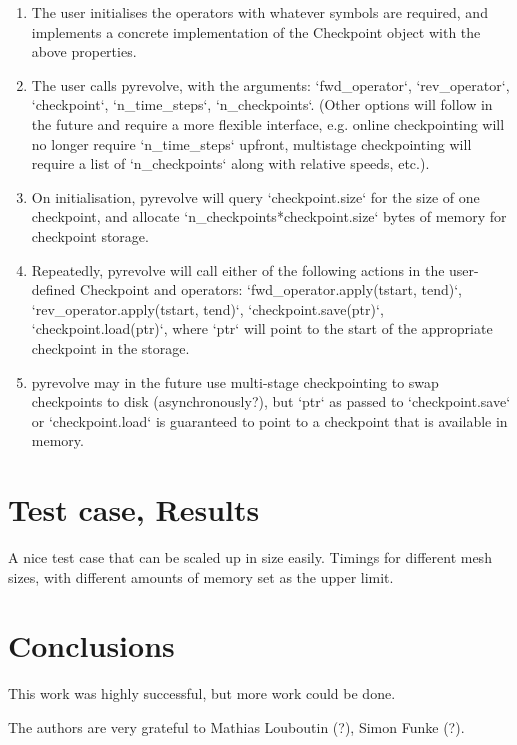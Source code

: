 \documentclass[sigconf]{acmart}
\begin{document}
\begin{enumerate}
\item The user initialises the operators with whatever symbols are required, and implements a
concrete
implementation of the Checkpoint object with the above properties.
\item The user calls pyrevolve, with the arguments: `fwd\_operator`, `rev\_operator`, `checkpoint`,
`n\_time\_steps`, `n\_checkpoints`. (Other options will follow in the future and require a more
flexible interface, e.g. online checkpointing will no longer require `n\_time\_steps` upfront,
multistage checkpointing will require a list of `n\_checkpoints` along with relative speeds, etc.).
\item On initialisation, pyrevolve will query `checkpoint.size` for the size of one checkpoint, and
allocate `n\_checkpoints*checkpoint.size` bytes of memory for checkpoint storage.
\item Repeatedly, pyrevolve will call either of the following actions in the user-defined Checkpoint
and operators: `fwd\_operator.apply(tstart, tend)`, `rev\_operator.apply(tstart, tend)`,
`checkpoint.save(ptr)`, `checkpoint.load(ptr)`, where `ptr` will point to the start of the
appropriate checkpoint in the storage.
\item pyrevolve may in the future use multi-stage checkpointing to swap checkpoints to disk
(asynchronously?), but `ptr` as passed to `checkpoint.save` or `checkpoint.load` is guaranteed to
point to a checkpoint that is available in memory.
\end{enumerate}


\section{Test case, Results}
\label{sec:experiment}
A nice test case that can be scaled up in size easily. Timings for different mesh sizes, with
different amounts of memory set as the upper limit.

\section{Conclusions}
This work was highly successful, but more work could be done.

\begin{acks}
  The authors are very grateful to Mathias Louboutin (?), Simon Funke
  (?). 
\end{acks}



 
\end{document}
